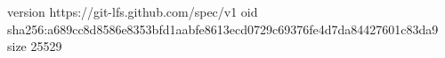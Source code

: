 version https://git-lfs.github.com/spec/v1
oid sha256:a689cc8d8586e8353bfd1aabfe8613ecd0729c69376fe4d7da84427601c83da9
size 25529
